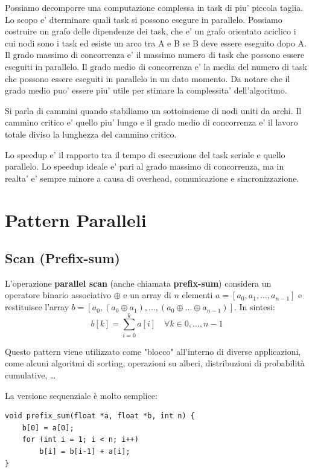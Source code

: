 Possiamo decomporre una computazione complessa in task di piu' piccola taglia. Lo scopo e' dterminare quali task si possono esegure in parallelo.
Possiamo costruire un grafo delle dipendenze dei task, che e' un grafo orientato aciclico i cui nodi sono i task ed esiste un arco tra A e B se B deve essere eseguito dopo A.
Il grado massimo di concorrenza e' il massimo numero di task che possono essere eseguiti in parallelo.
Il grado medio di concorrenza e' la media del numero di task che possono essere eseguiti in parallelo in un dato momento. Da notare che il grado medio puo' essere piu' utile per stimare la complessita' dell'algoritmo.

Si parla di cammini quando stabiliamo un sottoinsieme di nodi uniti da archi. Il cammino critico e' quello piu' lungo e il grado medio di concorrenza e' il lavoro totale diviso la lunghezza del cammino critico.

Lo speedup e' il rapporto tra il tempo di esecuzione del task seriale e quello parallelo. Lo speedup ideale e' pari al grado massimo di concorrenza, ma in realta' e' sempre minore a causa di overhead, comunicazione e sincronizzazione.

\section{Pattern Paralleli}

\subsection{Scan (Prefix-sum)}

L'operazione \textbf{parallel scan} (anche chiamata \textbf{prefix-sum}) considera un operatore binario associativo $\oplus$ e un array di $n$ elementi $a = [a_0, a_1, \dots, a_{n-1}]$ e restituisce l'array $b = [a_0, (a_0 \oplus a_1), \dots, (a_0 \oplus \dots \oplus a_{n-1})]$. In sintesi:
$$ b[k] = \sum_{i=0}^{k} a[i] \quad \forall k \in 0, \dots, n-1 $$

Questo pattern viene utilizzato come "blocco" all'interno di diverse applicazioni, come alcuni algoritmi di sorting, operazioni su alberi, distribuzioni di probabilità cumulative, \dots

La versione sequenziale è molto semplice:
\begin{lstlisting}[caption={prefix\_sum C}, label={lst:prefix_sum}]
void prefix_sum(float *a, float *b, int n) {
    b[0] = a[0];
    for (int i = 1; i < n; i++)
        b[i] = b[i-1] + a[i];
}
\end{lstlisting}

